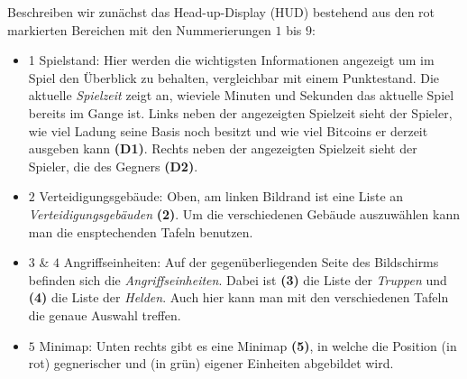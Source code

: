 Beschreiben wir zunächst das Head-up-Display (HUD) bestehend aus den rot markierten Bereichen mit den Nummerierungen $1$ bis $9$:
\begin{itemize}[leftmargin=*]
	\item{1 Spielstand:} Hier werden die wichtigsten Informationen angezeigt um im Spiel den Überblick zu behalten, vergleichbar mit einem Punktestand.
	Die aktuelle \textit{Spielzeit} zeigt an, wieviele Minuten und Sekunden das aktuelle Spiel bereits im Gange ist. Links neben der angezeigten Spielzeit sieht der Spieler, wie viel Ladung seine Basis noch besitzt und wie viel Bitcoins er derzeit ausgeben kann \textbf{(D1)}. Rechts neben der angezeigten Spielzeit sieht der Spieler, die des Gegners \textbf{(D2)}.
	\item {$2$ Verteidigungsgebäude:} Oben, am linken Bildrand ist eine Liste an \textit{Verteidigungsgebäuden} \textbf{(2)}. Um die verschiedenen Gebäude auszuwählen kann man die ensptechenden Tafeln benutzen.
	\item {$3$ \& $4$ Angriffseinheiten:} Auf der gegenüberliegenden Seite des Bildschirms befinden sich die \textit{Angriffseinheiten}. Dabei ist \textbf{(3)} die Liste der \textit{Truppen} und \textbf{(4)} die Liste der \textit{Helden}. Auch hier kann man mit den verschiedenen Tafeln die genaue Auswahl treffen.
	\item {$5$ Minimap:} Unten rechts gibt es eine Minimap \textbf{(5)}, in
	welche die Position (in rot) gegnerischer und (in grün) eigener Einheiten abgebildet wird.

\end{itemize}
